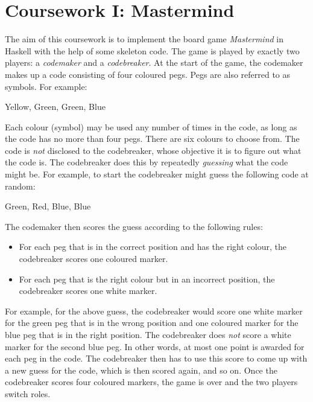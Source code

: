 
\newcommand{\deadlineOneTime}{noon}
\newcommand{\deadlineOneDate}{7 February 2019}
\newcommand{\submissionOneURL}{https://tabula.warwick.ac.uk/coursework/submission/1905b143-7b68-4f61-bf2d-5288934c6253}



\cleardoublepage
\chapter{Coursework I: Mastermind}

The aim of this coursework is to implement the board game \emph{Mastermind} in Haskell with the help of some skeleton code. The game is played by exactly two players: a \emph{codemaker} and a \emph{codebreaker}. At the start of the game, the codemaker makes up a code consisting of four coloured pegs. Pegs are also referred to as symbols. For example:
\begin{center}
    Yellow, Green, Green, Blue
\end{center}
Each colour (symbol) may be used any number of times in the code, as long as the code has no more than four pegs. There are six colours to choose from. The code is \emph{not} disclosed to the codebreaker, whose objective it is to figure out what the code is. The codebreaker does this by repeatedly \emph{guessing} what the code might be. For example, to start the codebreaker might guess the following code at random:
\begin{center}
    Green, Red, Blue, Blue
\end{center}
The codemaker then scores the guess according to the following rules:
\begin{itemize}
    \item For each peg that is in the correct position and has the right colour, the codebreaker scores one coloured marker.
    \item For each peg that is the right colour but in an incorrect position, the codebreaker scores one white marker.
\end{itemize}
For example, for the above guess, the codebreaker would score one white marker for the green peg that is in the wrong position and one coloured marker for the blue peg that is in the right position. The codebreaker does \emph{not} score a white marker for the second blue peg. In other words, at most one point is awarded for each peg in the code. The codebreaker then has to use this score to come up with a new guess for the code, which is then scored again, and so on. Once the codebreaker scores four coloured markers, the game is over and the two players switch roles.

